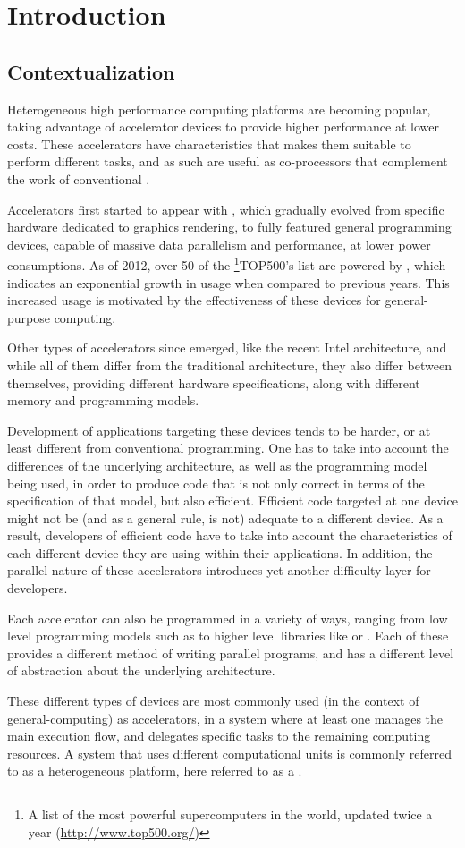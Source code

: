 \documentclass[main.tex]{subfiles}
\begin{document}
\section{Introduction}

\subsection{Contextualization}

Heterogeneous high performance computing platforms are becoming popular, taking advantage of accelerator devices to provide higher performance at lower costs. These accelerators have characteristics that makes them suitable to perform different tasks, and as such are useful as co-processors that complement the work of conventional \cpus.

Accelerators first started to appear with \gpus, which gradually evolved from specific hardware dedicated to graphics rendering, to fully featured general programming devices, capable of massive data parallelism and performance, at lower power consumptions. As of 2012, over 50 of the \footnote{A list of the most powerful supercomputers in the world, updated twice a year (\url{http://www.top500.org/})}{TOP500's} list are powered by \gpus, which indicates an exponential growth in usage when compared to previous years. This increased usage is motivated by the effectiveness of these devices for general-purpose computing.

Other types of accelerators since emerged, like the recent Intel \mic architecture, and while all of them differ from the traditional \cpu architecture, they also differ between themselves, providing different hardware specifications, along with different memory and programming models.

Development of applications targeting these devices tends to be harder, or at least different from conventional programming. One has to take into account the differences of the underlying architecture, as well as the programming model being used, in order to produce code that is not only correct in terms of the specification of that model, but also efficient. Efficient code targeted at one device might not be (and as a general rule, is not) adequate to a different device. As a result, developers of efficient code have to take into account the characteristics of each different device they are using within their applications. In addition, the parallel nature of these accelerators introduces yet another difficulty layer for developers.

Each accelerator can also be programmed in a variety of ways, ranging from low level programming models such as \cuda to higher level libraries like \openmp or \openacc. Each of these provides a different method of writing parallel programs, and has a different level of abstraction about the underlying architecture.

These different types of devices are most commonly used (in the context of general-computing) as accelerators, in a system where at least one \cpu manages the main execution flow, and delegates specific tasks to the remaining computing resources. A system that uses different computational units is commonly referred to as a heterogeneous platform, here referred to as a \hetplat.
\end{document}
